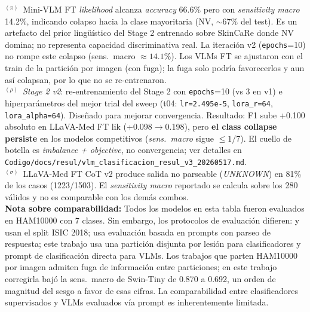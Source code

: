 \begin{table}[htbp]
\begin{minipage}{\textwidth}
  $^{(\pi)}$~Mini-VLM FT \textit{likelihood} alcanza \textit{accuracy} 66.6\% pero con
  \textit{sensitivity macro} 14.2\%, indicando colapso hacia la clase mayoritaria (NV, ${\sim}67\%$
  del test). Es un artefacto del prior lingüístico del Stage 2 entrenado sobre SkinCaRe
  donde NV domina; no representa capacidad discriminativa real.
  La iteración v2 (\texttt{epochs}=10) no rompe este colapso (sens.\ macro $\approx 14.1\%$).
  Los VLMs FT se ajustaron con el train de la partición por imagen (con fuga); la fuga solo podría
  favorecerlos y aun así colapsan, por lo que no se re-entrenaron.\\[4pt]
  $^{(\rho)}$~\textit{Stage 2 v2}: re-entrenamiento del Stage 2 con \texttt{epochs}=10 (vs 3 en v1)
  e hiperparámetros del mejor trial del sweep (t04: \texttt{lr=2.495e-5}, \texttt{lora\_r=64},
  \texttt{lora\_alpha=64}). Diseñado para mejorar convergencia. Resultado: F1 sube +0.100 absoluto
  en LLaVA-Med FT lik (+0.098$\to$0.198), pero \textbf{el class collapse persiste} en los modelos
  competitivos (\textit{sens.\ macro} sigue $\le 1/7$). El cuello de botella es \textit{imbalance + objective},
  no convergencia; ver detalles en \texttt{Codigo/docs/resul/vlm\_clasificacion\_resul\_v3\_20260517.md}.\\[4pt]
  $^{(\sigma)}$~LLaVA-Med FT CoT v2 produce salida no parseable (\textit{UNKNOWN}) en 81\% de los casos
  (1223/1503). El \textit{sensitivity macro} reportado se calcula sobre los 280 válidos y no es
  comparable con los demás combos.\\[4pt]
  \textbf{Nota sobre comparabilidad:}
  Todos los modelos en esta tabla fueron evaluados en HAM10000 con 7 clases.
  Sin embargo, los protocolos de evaluación difieren:
  \cite{SkinHealthMate2024} y~\cite{SkinSavvy22025} usan el split ISIC 2018;
  \cite{SkinR12025} usa evaluación basada en prompts con parseo de respuesta;
  este trabajo usa una partición disjunta por lesión para clasificadores y prompt
  de clasificación directa para VLMs. Los trabajos que parten HAM10000 por imagen admiten
  fuga de información entre particiones; en este trabajo corregirla bajó la sens.\ macro de Swin-Tiny
  de 0.870 a 0.692, un orden de magnitud del sesgo a favor de esas cifras.
  La comparabilidad entre clasificadores supervisados y VLMs evaluados
  vía prompt es inherentemente limitada.
\end{minipage}
\end{table}


